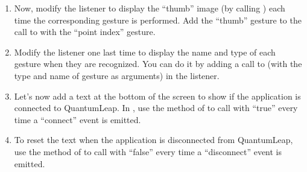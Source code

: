 {\begin{enumerate}
    \item Now, modify the listener to display the ``thumb'' image (by calling ) each time the corresponding gesture is performed. Add the ``thumb'' gesture to the call to  with the ``point index'' gesture.
    \item Modify the listener one last time to display the name and type of each gesture when they are recognized. You can do it by adding a call to  (with the type and name of gesture as arguments) in the listener.
    \item Let's now add a text at the bottom of the screen to show if the application is connected to QuantumLeap. In , use the  method of  to call  with ``true'' every time a ``connect'' event is emitted.
    \item To reset the text when the application is disconnected from QuantumLeap, use the  method of  to call  with ``false'' every time a ``disconnect'' event is emitted.
\end{enumerate}
}
